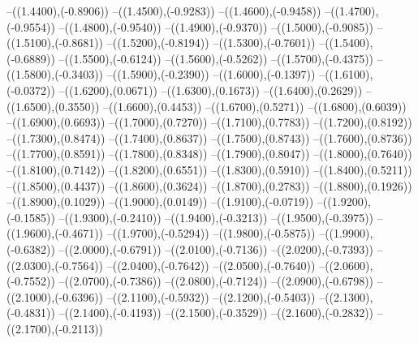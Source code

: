 {	--({\sx*(1.4400)},{\sy*(-0.8906)})
	--({\sx*(1.4500)},{\sy*(-0.9283)})
	--({\sx*(1.4600)},{\sy*(-0.9458)})
	--({\sx*(1.4700)},{\sy*(-0.9554)})
	--({\sx*(1.4800)},{\sy*(-0.9540)})
	--({\sx*(1.4900)},{\sy*(-0.9370)})
	--({\sx*(1.5000)},{\sy*(-0.9085)})
	--({\sx*(1.5100)},{\sy*(-0.8681)})
	--({\sx*(1.5200)},{\sy*(-0.8194)})
	--({\sx*(1.5300)},{\sy*(-0.7601)})
	--({\sx*(1.5400)},{\sy*(-0.6889)})
	--({\sx*(1.5500)},{\sy*(-0.6124)})
	--({\sx*(1.5600)},{\sy*(-0.5262)})
	--({\sx*(1.5700)},{\sy*(-0.4375)})
	--({\sx*(1.5800)},{\sy*(-0.3403)})
	--({\sx*(1.5900)},{\sy*(-0.2390)})
	--({\sx*(1.6000)},{\sy*(-0.1397)})
	--({\sx*(1.6100)},{\sy*(-0.0372)})
	--({\sx*(1.6200)},{\sy*(0.0671)})
	--({\sx*(1.6300)},{\sy*(0.1673)})
	--({\sx*(1.6400)},{\sy*(0.2629)})
	--({\sx*(1.6500)},{\sy*(0.3550)})
	--({\sx*(1.6600)},{\sy*(0.4453)})
	--({\sx*(1.6700)},{\sy*(0.5271)})
	--({\sx*(1.6800)},{\sy*(0.6039)})
	--({\sx*(1.6900)},{\sy*(0.6693)})
	--({\sx*(1.7000)},{\sy*(0.7270)})
	--({\sx*(1.7100)},{\sy*(0.7783)})
	--({\sx*(1.7200)},{\sy*(0.8192)})
	--({\sx*(1.7300)},{\sy*(0.8474)})
	--({\sx*(1.7400)},{\sy*(0.8637)})
	--({\sx*(1.7500)},{\sy*(0.8743)})
	--({\sx*(1.7600)},{\sy*(0.8736)})
	--({\sx*(1.7700)},{\sy*(0.8591)})
	--({\sx*(1.7800)},{\sy*(0.8348)})
	--({\sx*(1.7900)},{\sy*(0.8047)})
	--({\sx*(1.8000)},{\sy*(0.7640)})
	--({\sx*(1.8100)},{\sy*(0.7142)})
	--({\sx*(1.8200)},{\sy*(0.6551)})
	--({\sx*(1.8300)},{\sy*(0.5910)})
	--({\sx*(1.8400)},{\sy*(0.5211)})
	--({\sx*(1.8500)},{\sy*(0.4437)})
	--({\sx*(1.8600)},{\sy*(0.3624)})
	--({\sx*(1.8700)},{\sy*(0.2783)})
	--({\sx*(1.8800)},{\sy*(0.1926)})
	--({\sx*(1.8900)},{\sy*(0.1029)})
	--({\sx*(1.9000)},{\sy*(0.0149)})
	--({\sx*(1.9100)},{\sy*(-0.0719)})
	--({\sx*(1.9200)},{\sy*(-0.1585)})
	--({\sx*(1.9300)},{\sy*(-0.2410)})
	--({\sx*(1.9400)},{\sy*(-0.3213)})
	--({\sx*(1.9500)},{\sy*(-0.3975)})
	--({\sx*(1.9600)},{\sy*(-0.4671)})
	--({\sx*(1.9700)},{\sy*(-0.5294)})
	--({\sx*(1.9800)},{\sy*(-0.5875)})
	--({\sx*(1.9900)},{\sy*(-0.6382)})
	--({\sx*(2.0000)},{\sy*(-0.6791)})
	--({\sx*(2.0100)},{\sy*(-0.7136)})
	--({\sx*(2.0200)},{\sy*(-0.7393)})
	--({\sx*(2.0300)},{\sy*(-0.7564)})
	--({\sx*(2.0400)},{\sy*(-0.7642)})
	--({\sx*(2.0500)},{\sy*(-0.7640)})
	--({\sx*(2.0600)},{\sy*(-0.7552)})
	--({\sx*(2.0700)},{\sy*(-0.7386)})
	--({\sx*(2.0800)},{\sy*(-0.7124)})
	--({\sx*(2.0900)},{\sy*(-0.6798)})
	--({\sx*(2.1000)},{\sy*(-0.6396)})
	--({\sx*(2.1100)},{\sy*(-0.5932)})
	--({\sx*(2.1200)},{\sy*(-0.5403)})
	--({\sx*(2.1300)},{\sy*(-0.4831)})
	--({\sx*(2.1400)},{\sy*(-0.4193)})
	--({\sx*(2.1500)},{\sy*(-0.3529)})
	--({\sx*(2.1600)},{\sy*(-0.2832)})
	--({\sx*(2.1700)},{\sy*(-0.2113)})
}
